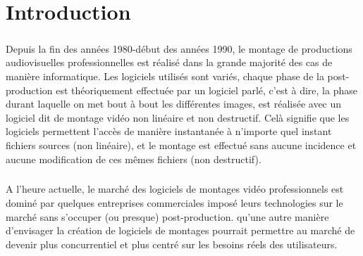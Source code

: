 








\setcounter{page}{1}
\newpage \chapter{Introduction}

\paragraph{}

Depuis la fin des années 1980-début des années 1990, le montage
de productions audiovisuelles professionnelles est réalisé dans la grande
majorité des cas de manière informatique. Les logiciels utilisés %
sont variés, chaque phase de la post-production est théoriquement
effectuée par un logiciel %
parlé, c'est à dire, la phase durant laquelle on met bout à bout
les différentes images, est réalisée avec un logiciel dit de montage
vidéo non linéaire et non destructif. Celà signifie que les logiciels
permettent l'accès de manière instantanée à n'importe quel instant %
fichiers sources (non linéaire), et le montage est effectué sans aucune
incidence et aucune modification de ces mêmes fichiers (non destructif).

\paragraph{}

A l'heure actuelle, le marché des logiciels de montages vidéo
professionnels est dominé par quelques entreprises commerciales %
imposé leurs technologies sur le marché sans s'occuper (ou presque) %
post-production. %
qu'une autre manière d'envisager la création de logiciels de
montages pourrait permettre au marché de devenir plus concurrentiel et
plus centré sur les besoins réels des utilisateurs.

